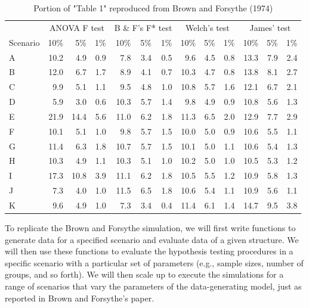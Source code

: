 \documentclass[
]{book}
\begin{document}
\begin{table}
\centering
\caption{\label{tab:BF-table1}Portion of "Table 1" reproduced from Brown and Forsythe (1974)}
\centering
\begin{tabular}[t]{l|r|r|r|r|r|r|r|r|r|r|r|r}
\hline
\multicolumn{1}{c|}{ } & \multicolumn{3}{c|}{ANOVA F test} & \multicolumn{3}{c|}{B \& F's F* test} & \multicolumn{3}{c|}{Welch's test} & \multicolumn{3}{c}{James' test} \\
\cline{2-4} \cline{5-7} \cline{8-10} \cline{11-13}
Scenario & 10\% & 5\% & 1\% & 10\% & 5\% & 1\% & 10\% & 5\% & 1\% & 10\% & 5\% & 1\%\\
\hline
A & 10.2 & 4.9 & 0.9 & 7.8 & 3.4 & 0.5 & 9.6 & 4.5 & 0.8 & 13.3 & 7.9 & 2.4\\
\hline
B & 12.0 & 6.7 & 1.7 & 8.9 & 4.1 & 0.7 & 10.3 & 4.7 & 0.8 & 13.8 & 8.1 & 2.7\\
\hline
C & 9.9 & 5.1 & 1.1 & 9.5 & 4.8 & 1.0 & 10.8 & 5.7 & 1.6 & 12.1 & 6.7 & 2.1\\
\hline
D & 5.9 & 3.0 & 0.6 & 10.3 & 5.7 & 1.4 & 9.8 & 4.9 & 0.9 & 10.8 & 5.6 & 1.3\\
\hline
E & 21.9 & 14.4 & 5.6 & 11.0 & 6.2 & 1.8 & 11.3 & 6.5 & 2.0 & 12.9 & 7.7 & 2.9\\
\hline
F & 10.1 & 5.1 & 1.0 & 9.8 & 5.7 & 1.5 & 10.0 & 5.0 & 0.9 & 10.6 & 5.5 & 1.1\\
\hline
G & 11.4 & 6.3 & 1.8 & 10.7 & 5.7 & 1.5 & 10.1 & 5.0 & 1.1 & 10.6 & 5.4 & 1.3\\
\hline
H & 10.3 & 4.9 & 1.1 & 10.3 & 5.1 & 1.0 & 10.2 & 5.0 & 1.0 & 10.5 & 5.3 & 1.2\\
\hline
I & 17.3 & 10.8 & 3.9 & 11.1 & 6.2 & 1.8 & 10.5 & 5.5 & 1.2 & 10.9 & 5.8 & 1.3\\
\hline
J & 7.3 & 4.0 & 1.0 & 11.5 & 6.5 & 1.8 & 10.6 & 5.4 & 1.1 & 10.9 & 5.6 & 1.1\\
\hline
K & 9.6 & 4.9 & 1.0 & 7.3 & 3.4 & 0.4 & 11.4 & 6.1 & 1.4 & 14.7 & 9.5 & 3.8\\
\hline
\end{tabular}
\end{table}

To replicate the Brown and Forsythe simulation, we will first write functions to generate data for a specified scenario and evaluate data of a given structure.
We will then use these functions to evaluate the hypothesis testing procedures in a specific scenario with a particular set of parameters (e.g., sample sizes, number of groups, and so forth). We will then scale up to execute the simulations for a range of scenarios that vary the parameters of the data-generating model, just as reported in Brown and Forsythe's paper.
\end{document}
